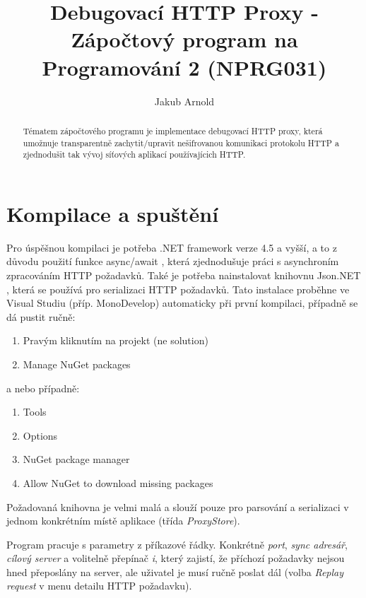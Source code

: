 \documentclass{article}
\title{Debugovací HTTP Proxy - Zápočtový program na Programování 2 (NPRG031)}
\author{Jakub Arnold}
\date{}
\begin{document}
\maketitle

\begin{abstract}
	Tématem zápočtového programu je implementace debugovací HTTP proxy, která umožnuje transparentně
	zachytit/upravit nešifrovanou komunikaci protokolu HTTP a zjednodušit tak vývoj síťových aplikací používajícich HTTP.
\end{abstract}

\section{Kompilace a spuštění}

Pro úspěšnou kompilaci je potřeba .NET framework verze 4.5 a vyšší, a to z důvodu použití funkce async/await \cite{async}, která zjednodušuje práci s asynchroním zpracováním HTTP požadavků. Také je potřeba nainstalovat knihovnu Json.NET \cite{newtonsoft}, která se používá pro serializaci HTTP požadavků. Tato instalace proběhne ve Visual Studiu (příp. MonoDevelop) automaticky při první kompilaci, případně se dá pustit ručně:

\begin{enumerate}
	\item Pravým kliknutím na projekt (ne solution)
	\item Manage NuGet packages
\end{enumerate}

a nebo případně:

\begin{enumerate}
	\item Tools
	\item Options
	\item NuGet package manager
	\item Allow NuGet to download missing packages
\end{enumerate}

Požadovaná knihovna je velmi malá a slouží pouze pro parsování a serializaci v jednom konkrétním místě aplikace (třída \emph{ProxyStore}).

Program pracuje s parametry z příkazové řádky. Konkrétně \emph{port}, \emph{sync adresář}, \emph{cílový server} a volitelně přepínač \emph{i}, který zajistí, že příchozí požadavky nejsou hned přeposlány na server, ale uživatel je musí ručně poslat dál (volba \emph{Replay request} v menu detailu HTTP požadavku).
\end{document}
